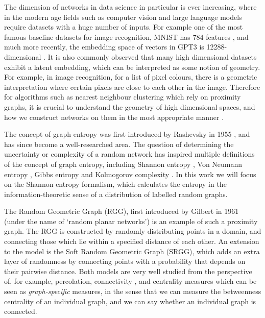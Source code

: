 \documentclass{article}
\begin{document}
\noindent The dimension of networks in data science in particular is ever increasing, where in the modern age fields such as computer vision and large language models require datasets with a huge number of inputs. For example one of the most famous baseline datasets for image recognition, MNIST has 784 features \cite{lecun1998gradient}, and much more recently, the embedding space of vectors in GPT3 is 12288-dimensional \cite{NEURIPS2020_1457c0d6}. It is also commonly observed that many high dimensional datasets exhibit a latent embedding, which can be interpreted as some notion of geometry. For example, in image recognition, for a list of pixel colours, there is a geometric interpretation where certain pixels are close to each other in the image. Therefore for algorithms such as nearest neighbour clustering which rely on proximity graphs, it is crucial to understand the geometry of high dimensional spaces, and how we construct networks on them in the most appropriate manner \cite{mittal2019clustering}. \newline

\noindent The concept of graph entropy was first introduced by Rashevsky in 1955 \cite{rashevsky1955life}, and has since become a well-researched area. The question of determining the uncertainty or complexity of a random network has inspired multiple definitions of the concept of graph entropy, including Shannon entropy  \cite{coon2018entropy}, Von Neumann entropy \cite{passerini2009quantifying}, Gibbs entropy \cite{anand2010gibbs} and Kolmogorov complexity \cite{mowshowitz2012entropy}. In this work we will focus on the Shannon entropy formalism, which calculates the entropy in the information-theoretic sense of a distribution of labelled random graphs. \newline

\noindent The Random Geometric Graph (RGG), first introduced by Gilbert in 1961 \cite{gilbert1961random} (under the name of `random planar networks') is an example of such a proximity graph. The RGG is constructed by randomly distributing points in a domain, and connecting those which lie within a specified distance of each other. An extension to the model is the Soft Random Geometric Graph (SRGG), which adds an extra layer of randomness by connecting points with a probability that depends on their pairwise distance. Both models are very well studied from the perspective of, for example, percolation, \cite{penrose2003random} connectivity \cite{penrose2016connectivity}, and centrality measures \cite{giles2015betweenness} which can be seen as \textit{graph-specific} measures, in the sense that we can measure the betweenness centrality of an individual graph, and we can say whether an individual graph is connected. \newline
\end{document}
